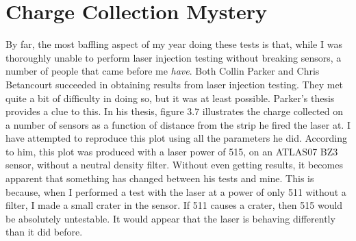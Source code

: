 \documentclass{report}
\begin{document}
        \section{Charge Collection Mystery} \label{sect:mystery}
            By far, the most baffling aspect of my year doing these tests is that, while I was thoroughly unable to perform laser injection testing without breaking sensors, a number of people that came before me \textit{have}. Both Collin Parker and Chris Betancourt succeeded in obtaining results from laser injection testing. They met quite a bit of difficulty in doing so, but it was at least possible. Parker's thesis provides a clue to this. In his thesis, figure 3.7 illustrates the charge collected on a number of sensors as a function of distance from the strip he fired the laser at. I have attempted to reproduce this plot using all the parameters he did. According to him, this plot was produced with a laser power of 515, on an ATLAS07 BZ3 sensor, without a neutral density filter. Without even getting results, it becomes apparent that something has changed between his tests and mine. This is because, when I performed a test with the laser at a power of only 511 without a filter, I made a small crater in the sensor. If 511 causes a crater, then 515 would be absolutely untestable. It would appear that the laser is behaving differently than it did before.
            




        
    
\end{document}
